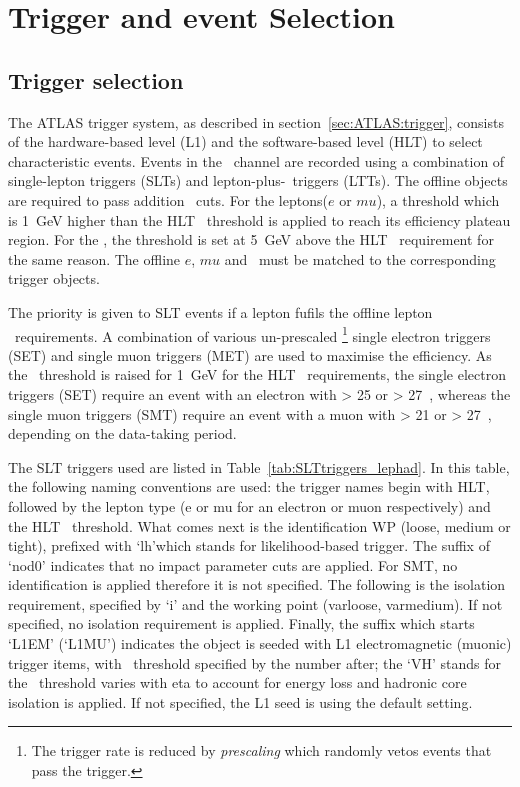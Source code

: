 \section{Trigger and event Selection}

\subsection{Trigger selection}
\label{sec:DiHiggs:trigger}

The ATLAS trigger system, as described in section~\ref{sec:ATLAS:trigger},
consists of the hardware-based level (L1) and the software-based level (HLT)
to select characteristic events. 
Events in the \lephad\ channel
are recorded using a combination of single-lepton triggers (SLTs) 
and lepton-plus-\tauhad\ triggers (LTTs). 
The offline objects are required to pass addition 
\pt\ cuts. For the leptons($e$ or $mu$), a threshold which is
1~GeV higher than the HLT \pt\ threshold is applied to
reach its efficiency plateau region. 
For the \tauhad, the threshold is set at 5~GeV above the
HLT \pt\ requirement for the same reason.
The offline $e$, $mu$ and \tauhad\ must be matched to
the corresponding trigger objects. 

The priority is given to SLT events if a lepton fufils
the offline lepton \pt\ requirements. 
A combination of various un-prescaled 
\footnote{The trigger rate is reduced by \textit{prescaling} which randomly 
vetos events that pass the trigger.} 
single electron triggers (SET) 
and single muon triggers (MET) are used to 
maximise the efficiency.
As the \pt\ threshold is raised for 1~GeV for the 
HLT \pt\ requirements,
the single electron triggers (SET) 
require an event with an electron with \pT > 25 or > 27~\GeV,
whereas the single muon triggers (SMT) require an event with a 
muon with \pT > 21 or > 27~\GeV,  depending on the data-taking period.

The SLT triggers used are listed in Table~\ref{tab:SLTtriggers_lephad}. 
In this table, the following naming conventions are used:
the trigger names begin with HLT, followed by the 
lepton type (e or mu for an electron or muon respectively) and the 
HLT \pt\ threshold. 
What comes next is the identification WP (loose, medium or tight), 
prefixed with `lh'which stands for likelihood-based trigger. 
The suffix of `nod0' indicates that no impact parameter cuts are
applied. 
For SMT, no identification is applied 
therefore it is not specified. 
The following is the isolation requirement, 
specified by `i' and the working point (varloose, varmedium).
If not specified, no isolation requirement is applied.
Finally, the suffix which starts `L1EM' (`L1MU') indicates the 
object is seeded with L1 electromagnetic (muonic) trigger items, 
with \pt\ threshold specified by the number after; the `VH' stands for 
the \pt\ threshold varies with eta to account for energy loss
and hadronic core isolation is applied. If not specified,
the L1 seed is using the default setting. 


